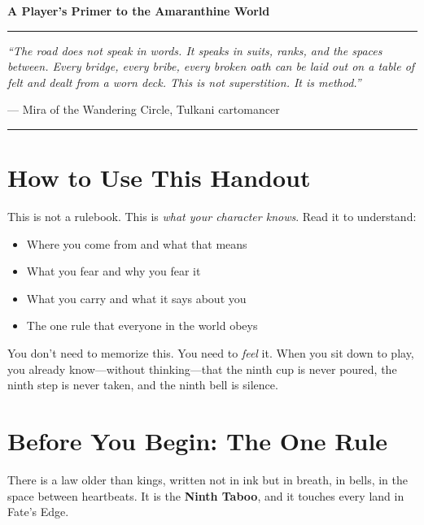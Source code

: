 \documentclass[10pt]{article}
\begin{document}
\begin{center}
{\Large \textbf{A Player's Primer to the Amaranthine World}}
\end{center}

\vspace{-1em}

\begin{center}
\rule{0.8\textwidth}{0.5pt}
\vspace{0.5em}
\itshape\small
``The road does not speak in words. It speaks in suits, ranks, and the spaces between. 
Every bridge, every bribe, every broken oath can be laid out on a table of felt and dealt 
from a worn deck. This is not superstition. It is method.''
\vspace{0.3em}

--- Mira of the Wandering Circle, Tulkani cartomancer
\rule{0.8\textwidth}{0.5pt}
\end{center}

\vspace{1em}

\section*{How to Use This Handout}

This is not a rulebook. This is \emph{what your character knows}. Read it to understand:

\begin{itemize}
\item Where you come from and what that means
\item What you fear and why you fear it
\item What you carry and what it says about you
\item The one rule that everyone in the world obeys
\end{itemize}

You don't need to memorize this. You need to \emph{feel} it. When you sit down to play, you already know—without thinking—that the ninth cup is never poured, the ninth step is never taken, and the ninth bell is silence.

\section*{Before You Begin: The One Rule}

There is a law older than kings, written not in ink but in breath, in bells, in the space 
between heartbeats. It is the \textbf{Ninth Taboo}, and it touches every land in Fate's Edge.
\end{document}
